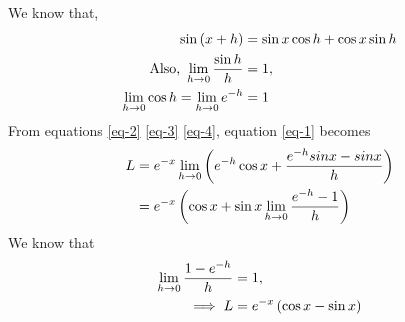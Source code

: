\documentclass[journal,12pt,twocolumn]{IEEEtran}
\begin{document}
We know that,
\begin{align}
    \label{eq-2}
    \sin \left(x+h\right) &= \sin x \cos h + \cos x \sin h\\
    \label{eq-3}
    \text{Also, } \lim_{h \to 0} \frac{\sin h}{h} &= 1,\\
    \label{eq-4}
    \lim_{h \to 0} \cos h = \lim_{h \to 0} e^{-h} &= 1
\end{align}
From equations \eqref{eq-2} \eqref{eq-3} \eqref{eq-4}, equation \eqref{eq-1} becomes
\begin{align}
    L &= e^{-x} \lim_{h \to 0} \left(e^{-h} \cos x +\frac{e^{-h}sinx - sinx}{h}\right)\\
    &= e^{-x} \left(\cos x + \sin x \lim_{h \to 0} \frac{e^{-h}-1}{h}\right)
\end{align}
We know that
\begin{align}
    \lim_{h \to 0} \frac{1-e^{-h}}{h} &= 1,\\
    \implies L &= e^{-x} \left(\cos x - \sin x\right)
\end{align}
\end{document}
